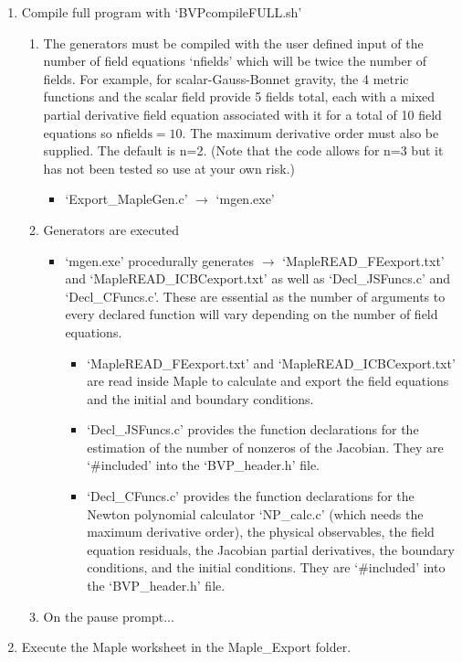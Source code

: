 \documentclass{article}
\newcommand{\rarr}{\rightarrow}
\begin{document}
\begin{enumerate}
\item Compile full program with `BVPcompileFULL.sh'
\begin{enumerate}
\item The generators must be compiled with the user defined input of the number of field equations `nfields' which will be twice the number of fields. For example, for scalar-Gauss-Bonnet gravity, the 4 metric functions and the scalar field provide 5 fields total, each with a mixed partial derivative field equation associated with it for a total of 10 field equations so $\mathrm{nfields} = 10$. The maximum derivative order must also be supplied. The default is n=2. (Note that the code allows for n=3 but it has not been tested so use at your own risk.)
\begin{itemize}
\item `Export\_MapleGen.c' $\rarr$ `mgen.exe'
\end{itemize}
\item Generators are executed
\begin{itemize}
\item `mgen.exe' procedurally generates $\rarr$ `MapleREAD\_FEexport.txt' and `MapleREAD\_ICBCexport.txt' as well as `Decl\_JSFuncs.c' and `Decl\_CFuncs.c'. These are essential as the number of arguments to every declared function will vary depending on the number of field equations.
\begin{itemize}
\item `MapleREAD\_FEexport.txt' and `MapleREAD\_ICBCexport.txt' are read inside Maple to calculate and export the field equations and the initial and boundary conditions.
\item `Decl\_JSFuncs.c' provides the function declarations for the estimation of the number of nonzeros of the Jacobian. They are `\#included' into the `BVP\_header.h' file.
\item `Decl\_CFuncs.c' provides the function declarations for the Newton polynomial calculator `NP\_calc.c' (which needs the maximum derivative order), the physical observables, the field equation residuals, the Jacobian partial derivatives, the boundary conditions, and the initial conditions. They are `\#included' into the `BVP\_header.h' file.
\end{itemize}
\end{itemize}
\item On the pause prompt...
\end{enumerate}
\item Execute the Maple worksheet in the Maple\_Export folder.

\end{enumerate}
\end{document}
